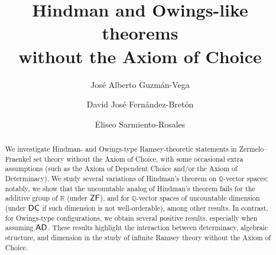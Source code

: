 \documentclass{amsart}
\theoremstyle{definition}
\newcommand{\zf}{\mathnormal{\mathsf{ZF}}}
\newcommand{\dc}{\mathnormal{\mathsf{DC}}}
\newcommand{\ad}{\mathnormal{\mathsf{AD}}}
\newcommand{\ac}{\mathnormal{\mathsf{AC}}}
\theoremstyle{remark}
\numberwithin{equation}{section}
\begin{document}
\title[Hindman and Owings-like theorems without $\ac$]{Hindman and Owings-like theorems \\ without the Axiom of Choice}


\author[Guzmán-Vega]{José Alberto Guzmán-Vega}
\address{Escuela Superior de Física y Matemáticas, Instituto Politécnico Nacional, Av. Instituto Politécnico Nacional s/n Edificio 9, Col. San Pedro Zacatenco, Alcaldía Gustavo A. Madero, 07738, CDMX, México}

\author[Fernández-Bretón]{David José Fernández-Bretón}
\address{Escuela Superior de Física y Matemáticas, Instituto Politécnico Nacional, Av. Instituto Politécnico Nacional s/n Edificio 9, Col. San Pedro Zacatenco, Alcaldía Gustavo A. Madero, 07738, CDMX, México}

\author[Sarmiento-Rosales]{Eliseo Sarmiento-Rosales}
\address{Escuela Superior de Física y Matemáticas, Instituto Politécnico Nacional, Av. Instituto Politécnico Nacional s/n Edificio 9, Col. San Pedro Zacatenco, Alcaldía Gustavo A. Madero, 07738, CDMX, México}






\date{}

\dedicatory{}

\commby{}

\begin{abstract}
We investigate Hindman- and Owings-type Ramsey-theoretic statements in Zermelo–Fraenkel set theory without the Axiom of Choice, with some occasional extra assumptions (such as the Axiom of Dependent Choice and/or the Axiom of Determinacy). We study several variations of Hindman's theorem on $\mathbb Q$-vector spaces; notably, we show that the uncountable analog of Hindman's theorem fails for the additive group of $\mathbb R$ (under $\zf$), and for $\mathbb{Q}$-vector spaces of uncountable dimension (under $\dc$ if such dimension is not well-orderable), among other results. In contrast, for Owings-type configurations, we obtain several positive results, especially when assuming $\ad$. These results highlight the interaction between determinacy, algebraic structure, and dimension in the study of infinite Ramsey theory without the Axiom of Choice.
\end{abstract}
\end{document}
